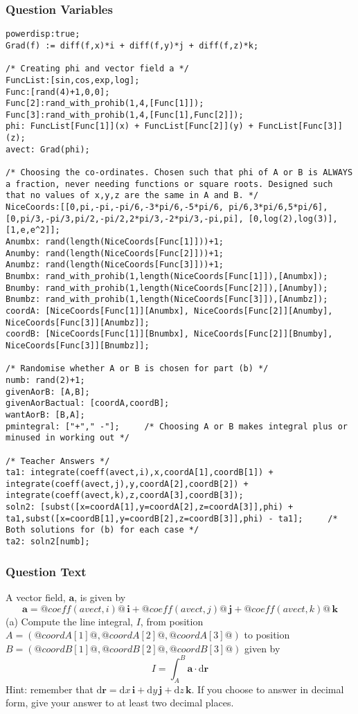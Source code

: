 \documentclass[a4paper,10pt]{article}
\begin{document}
\subsubsection{Question Variables}
\begin{lstlisting}
powerdisp:true;
Grad(f) := diff(f,x)*i + diff(f,y)*j + diff(f,z)*k;

/* Creating phi and vector field a */
FuncList:[sin,cos,exp,log];
Func:[rand(4)+1,0,0];
Func[2]:rand_with_prohib(1,4,[Func[1]]);
Func[3]:rand_with_prohib(1,4,[Func[1],Func[2]]);
phi: FuncList[Func[1]](x) + FuncList[Func[2]](y) + FuncList[Func[3]](z);
avect: Grad(phi);

/* Choosing the co-ordinates. Chosen such that phi of A or B is ALWAYS a fraction, never needing functions or square roots. Designed such that no values of x,y,z are the same in A and B. */
NiceCoords:[[0,pi,-pi,-pi/6,-3*pi/6,-5*pi/6, pi/6,3*pi/6,5*pi/6], [0,pi/3,-pi/3,pi/2,-pi/2,2*pi/3,-2*pi/3,-pi,pi], [0,log(2),log(3)], [1,e,e^2]];
Anumbx: rand(length(NiceCoords[Func[1]]))+1;
Anumby: rand(length(NiceCoords[Func[2]]))+1;
Anumbz: rand(length(NiceCoords[Func[3]]))+1;
Bnumbx: rand_with_prohib(1,length(NiceCoords[Func[1]]),[Anumbx]);
Bnumby: rand_with_prohib(1,length(NiceCoords[Func[2]]),[Anumby]);
Bnumbz: rand_with_prohib(1,length(NiceCoords[Func[3]]),[Anumbz]);
coordA: [NiceCoords[Func[1]][Anumbx], NiceCoords[Func[2]][Anumby], NiceCoords[Func[3]][Anumbz]];
coordB: [NiceCoords[Func[1]][Bnumbx], NiceCoords[Func[2]][Bnumby], NiceCoords[Func[3]][Bnumbz]];

/* Randomise whether A or B is chosen for part (b) */
numb: rand(2)+1;
givenAorB: [A,B];
givenAorBactual: [coordA,coordB];
wantAorB: [B,A];
pmintegral: ["+"," -"];     /* Choosing A or B makes integral plus or minused in working out */

/* Teacher Answers */
ta1: integrate(coeff(avect,i),x,coordA[1],coordB[1]) + integrate(coeff(avect,j),y,coordA[2],coordB[2]) + integrate(coeff(avect,k),z,coordA[3],coordB[3]);
soln2: [subst([x=coordA[1],y=coordA[2],z=coordA[3]],phi) + ta1,subst([x=coordB[1],y=coordB[2],z=coordB[3]],phi) - ta1];     /* Both solutions for (b) for each case */
ta2: soln2[numb];
\end{lstlisting}
\subsubsection{Question Text}
A vector field, \(\textbf{a}\), is given by \[ \textbf{a} = @coeff(avect,i)@ \, \textbf{i} + @coeff(avect,j)@ \, \textbf{j} + @coeff(avect,k)@ \, \textbf{k} \](a) Compute the line integral, \(I\), from position \(A=(@coordA[1]@,@coordA[2]@,@coordA[3]@)\) to position \(B=(@coordB[1]@,@coordB[2]@,@coordB[3]@)\) given by\[ I = \int_{A}^{B} \textbf{a} \cdot \text{d}\textbf{r} \] Hint: remember that \(\text{d}\textbf{r} = \text{d}x \, \textbf{i} + \text{d}y \, \textbf{j} + \text{d}z \, \textbf{k}\). If you choose to answer in decimal form, give your answer to at least two decimal places.
\end{document}
